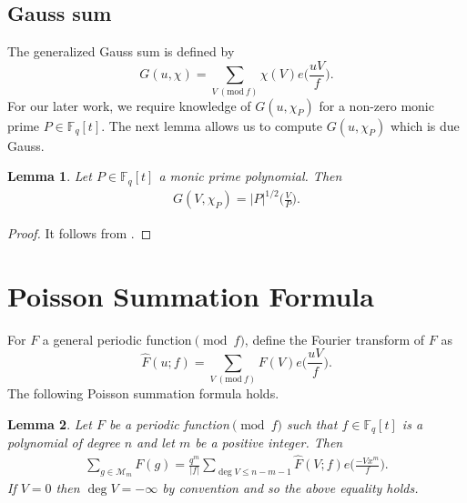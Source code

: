 \documentclass[12pt,reqno]{amsart}
\newcommand{\Mod}[1]{\ (\mathrm{mod}\ #1)}
\newcommand{\BF}{\mathbb{F}}
\newcommand{\CM}{\mathcal{M}}
\newtheorem{lem}{Lemma}[subsection]
\begin{document}
\subsection{Gauss sum}
The generalized Gauss sum is defined by
$$
G(u,\chi)= \sum\limits_{V \Mod f} \chi(V) e \Big (\frac{uV}{f}\Big ).
$$
For our later work, we require knowledge of $G(u,\chi_P)$ for a non-zero monic prime $P \in \BF_{q}[t]$. The next lemma allows us to compute $G(u,\chi_P)$ which is due Gauss. 
\begin{lem}\label{GaussLemma}
    Let $P \in \BF_{q}[t]$ a monic prime polynomial. Then
    \begin{align*}
        G(V, \chi_{P}) = |P|^{1/2}\Big(\frac{V}{P}\Big ) .
    \end{align*}
\end{lem}
\begin{proof}
   It follows from \cite[Lemma 3.2]{AFlo}.
\end{proof}



\section{Poisson Summation Formula}
For $F$ a general periodic function$\pmod f$, define the Fourier transform of $F$ as
$$
\widehat{F}(u; f)=  \sum\limits_{V\Mod f} F(V) e \Big (\frac{uV}{f} \Big ).
$$
The following Poisson summation formula holds. 
\begin{lem}\label{possionformula}
Let $F$ be a periodic function$\pmod f$ such that $f \in \BF_{q}[t]$ is a polynomial of degree $n$ and let $m$ be a positive integer. Then
    \begin{align}\label{poisson}
    \sum\limits_{g \in \CM_{m}}  F(g) = \frac{q^m}{|f|} \sum\limits_{\deg V \leq n-m-1} \widehat{F}(V;f)e \Big (\frac{-Vx^m}{f} \Big).       
    \end{align}
If $V=0$ then $\deg V = -\infty$ by convention and so the above equality holds. 
\end{lem}
\end{document}
